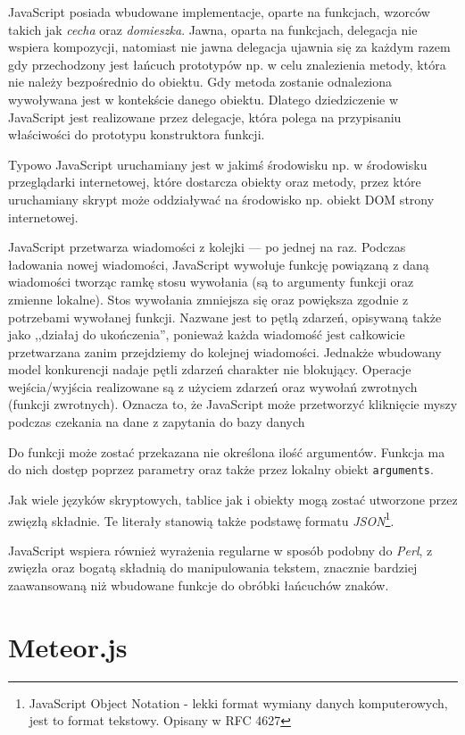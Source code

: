 JavaScript posiada wbudowane implementacje, oparte na funkcjach, wzorców takich jak \textit{cecha} oraz \textit{domieszka}. Jawna, oparta na funkcjach, delegacja nie wspiera kompozycji, natomiast nie jawna delegacja ujawnia się za każdym razem gdy przechodzony jest łańcuch prototypów np. w celu znalezienia metody, która nie należy bezpośrednio do obiektu. Gdy metoda zostanie odnaleziona wywoływana jest w kontekście danego obiektu. Dlatego dziedziczenie w JavaScript jest realizowane przez delegacje, która polega na przypisaniu właściwości do prototypu konstruktora funkcji\cite{jsWiki}.

Typowo JavaScript uruchamiany jest w jakimś środowisku np. w środowisku przeglądarki internetowej, które dostarcza obiekty oraz metody, przez które uruchamiany skrypt może oddziaływać na środowisko np. obiekt DOM strony internetowej. 

JavaScript przetwarza wiadomości z kolejki --- po jednej na raz. Podczas ładowania nowej wiadomości, JavaScript wywołuje funkcję powiązaną z daną wiadomości tworząc ramkę stosu wywołania (są to argumenty funkcji oraz zmienne lokalne). Stos wywołania zmniejsza się oraz powiększa zgodnie z potrzebami wywołanej funkcji. Nazwane jest to pętlą zdarzeń, opisywaną także jako ,,działaj do ukończenia'', ponieważ każda wiadomość jest całkowicie przetwarzana zanim przejdziemy do kolejnej wiadomości. Jednakże wbudowany model konkurencji nadaje pętli zdarzeń charakter nie blokujący. Operacje wejścia/wyjścia realizowane są z użyciem zdarzeń oraz wywołań zwrotnych (funkcji zwrotnych). Oznacza to, że JavaScript może przetworzyć kliknięcie myszy podczas czekania na dane z zapytania do bazy danych\cite{jsWiki}

Do funkcji może zostać przekazana nie określona ilość argumentów. Funkcja ma do nich dostęp poprzez parametry oraz także przez lokalny obiekt \verb|arguments|\cite{jsWiki}.

Jak wiele języków skryptowych, tablice jak i obiekty mogą zostać utworzone przez zwięzłą składnie. Te literały stanowią także podstawę formatu \emph{JSON}\footnote{JavaScript Object Notation - lekki format wymiany danych komputerowych, jest to format tekstowy. Opisany w RFC 4627}\cite{jsWiki}.

JavaScript wspiera również wyrażenia regularne w sposób podobny do \emph{Perl}, z zwięzła oraz bogatą składnią do manipulowania tekstem, znacznie bardziej zaawansowaną niż wbudowane funkcje do obróbki łańcuchów znaków.

\section{Meteor.js}

